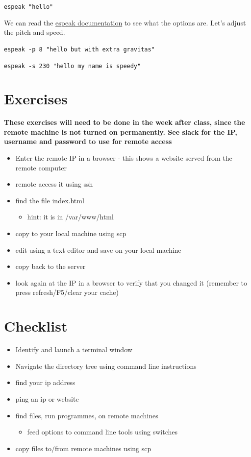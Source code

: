 \documentclass[
]{book}
\providecommand{\tightlist}{%
  \setlength{\itemsep}{0pt}\setlength{\parskip}{0pt}}
\begin{document}
\texttt{espeak\ "hello"}

We can read the \href{https://linux.die.net/man/1/espeak}{espeak documentation} to see what the options are. Let's adjust the pitch and speed.

\texttt{espeak\ -p\ 8\ "hello\ but\ with\ extra\ gravitas"}

\texttt{espeak\ -s\ 230\ "hello\ my\ name\ is\ speedy"}

\hypertarget{exercises-4}{%
\section{Exercises}\label{exercises-4}}

\textbf{These exercises will need to be done in the week after class, since the remote machine is not turned on permanently. See slack for the IP, username and password to use for remote access}

\begin{itemize}
\tightlist
\item
  Enter the remote IP in a browser - this shows a website served from the remote computer
\item
  remote access it using ssh
\item
  find the file index.html

  \begin{itemize}
  \tightlist
  \item
    hint: it is in /var/www/html
  \end{itemize}
\item
  copy to your local machine using scp
\item
  edit using a text editor and save on your local machine
\item
  copy back to the server
\item
  look again at the IP in a browser to verify that you changed it (remember to press refresh/F5/clear your cache)
\end{itemize}

\hypertarget{checklist-6}{%
\section{Checklist}\label{checklist-6}}

\begin{itemize}
\tightlist
\item
  Identify and launch a terminal window
\item
  Navigate the directory tree using command line instructions
\item
  find your ip address
\item
  ping an ip or website
\item
  find files, run programmes, on remote machines

  \begin{itemize}
  \tightlist
  \item
    feed options to command line tools using switches
  \end{itemize}
\item
  copy files to/from remote machines using scp
\end{itemize}
\end{document}
